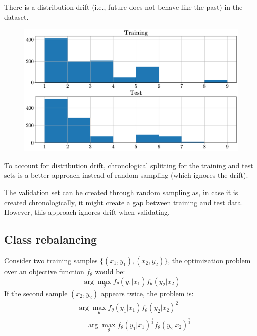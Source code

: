 \begin{remark}
    There is a distribution drift (i.e., future does not behave like the past) in the dataset.

    \begin{figure}[H]
        \centering
        \includegraphics[width=0.65\linewidth]{./img/_skinwrapper_distribution.pdf}
    \end{figure}
\end{remark}

\begin{remark}
    To account for distribution drift, chronological splitting for the training and test sets is a better approach instead of random sampling (which ignores the drift).

    The validation set can be created through random sampling as, in case it is created chronologically, it might create a gap between training and test data. However, this approach ignores drift when validating.
\end{remark}


\subsection{Class rebalancing}


\begin{remark}
    Consider two training samples $\{ (x_1, y_1), (x_2, y_2) \}$, the optimization problem over an objective function $f_\theta$ would be:
    \[
        \arg\max_\theta f_\theta(y_1 | x_1) f_\theta(y_2 | x_2)
    \]
    If the second sample $(x_2, y_2)$ appears twice, the problem is:
    \[
        \begin{split}
            &\arg\max_\theta f_\theta(y_1 | x_1) f_\theta(y_2 | x_2)^2 \\
            &= \arg\max_\theta f_\theta(y_1 | x_1)^{\frac{1}{3}} f_\theta(y_2 | x_2)^{\frac{2}{3}}
        \end{split}
    \]
\end{remark}

